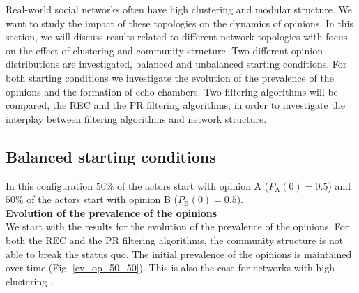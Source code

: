 \documentclass[11 pt , letterpaper , twoside , openright]{book}
\begin{document}
Real-world social networks often have high clustering and modular structure. We want to study the impact of these topologies on the dynamics of opinions. In this section, we will discuss results related to different network topologies with focus on the effect of clustering and community structure. Two different opinion distributions are investigated, balanced and unbalanced starting conditions. For both starting conditions we investigate the evolution of the prevalence of the opinions and the formation of echo chambers. Two filtering algorithms will be compared, the REC and the PR filtering algorithms, in order to investigate the interplay between filtering algorithms and network structure.

\subsection{Balanced starting conditions}
\label{50-50}

In this configuration $50 \%$ of the actors start with opinion A ($P_{\text{A}}(0) = 0.5$) and $50 \%$ of the actors start with opinion B ($P_{\text{B}}(0) = 0.5$).\\
\newline
\textbf{Evolution of the prevalence of the opinions}\\
\newline
We start with the results for the evolution of the prevalence of the opinions. For both the REC and the PR filtering algorithms, the community structure is not able to break the status quo. The initial prevalence of the opinions is maintained over time (Fig. \ref{ev_op_50_50}). This is also the case for networks with high clustering \cite{Perra2019}. 
\end{document}
